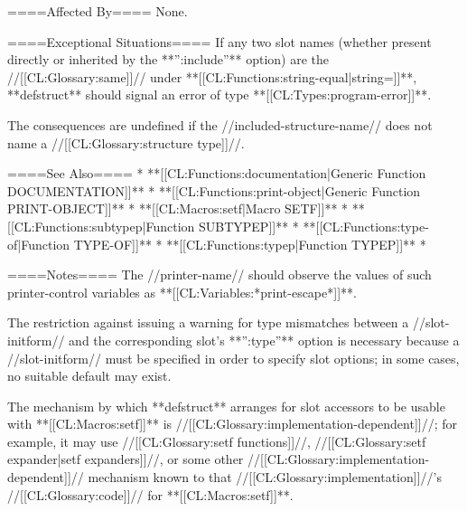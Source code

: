 ====Affected By====
None.

====Exceptional Situations====
If any two slot names (whether present directly or inherited by the **'':include''** option) are the //[[CL:Glossary:same]]// under **[[CL:Functions:string-equal|string=]]**, **defstruct** should signal an error of type **[[CL:Types:program-error]]**.

The consequences are undefined if the //included-structure-name// does not name a //[[CL:Glossary:structure type]]//.

====See Also====
  * **[[CL:Functions:documentation|Generic Function DOCUMENTATION]]**
  * **[[CL:Functions:print-object|Generic Function PRINT-OBJECT]]**
  * **[[CL:Macros:setf|Macro SETF]]**
  * **[[CL:Functions:subtypep|Function SUBTYPEP]]**
  * **[[CL:Functions:type-of|Function TYPE-OF]]**
  * **[[CL:Functions:typep|Function TYPEP]]**
  * {\secref\Compilation}

====Notes====
The //printer-name// should observe the values of such printer-control variables as **[[CL:Variables:*print-escape*]]**.

The restriction against issuing a warning for type mismatches between a //slot-initform// and the corresponding slot's **'':type''** option is necessary because a //slot-initform// must be specified in order to specify slot options; in some cases, no suitable default may exist.

The mechanism by which **defstruct** arranges for slot accessors to be usable with **[[CL:Macros:setf]]** is //[[CL:Glossary:implementation-dependent]]//; for example, it may use //[[CL:Glossary:setf functions]]//, //[[CL:Glossary:setf expander|setf expanders]]//, or some other //[[CL:Glossary:implementation-dependent]]// mechanism known to that //[[CL:Glossary:implementation]]//'s //[[CL:Glossary:code]]// for **[[CL:Macros:setf]]**.

                       
